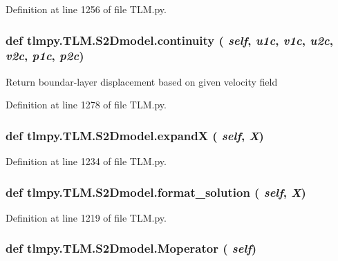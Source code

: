 Definition at line 1256 of file TLM.py.\hypertarget{classtlmpy_1_1TLM_1_1S2Dmodel_ab07406ffa8f2de222fad195cc51a3a2b}{
\subsubsection[{continuity}]{\setlength{\rightskip}{0pt plus 5cm}def tlmpy.TLM.S2Dmodel.continuity ( {\em self}, \/   {\em u1c}, \/   {\em v1c}, \/   {\em u2c}, \/   {\em v2c}, \/   {\em p1c}, \/   {\em p2c})}}
\label{classtlmpy_1_1TLM_1_1S2Dmodel_ab07406ffa8f2de222fad195cc51a3a2b}
\begin{DoxyVerb}Return boundar-layer displacement based on given velocity field\end{DoxyVerb}
 

Definition at line 1278 of file TLM.py.\hypertarget{classtlmpy_1_1TLM_1_1S2Dmodel_a86697bc16c2f9f75825a4c1a5ad0f4a9}{
\subsubsection[{expandX}]{\setlength{\rightskip}{0pt plus 5cm}def tlmpy.TLM.S2Dmodel.expandX ( {\em self}, \/   {\em X})}}
\label{classtlmpy_1_1TLM_1_1S2Dmodel_a86697bc16c2f9f75825a4c1a5ad0f4a9}


Definition at line 1234 of file TLM.py.\hypertarget{classtlmpy_1_1TLM_1_1S2Dmodel_a40f454d109a9388f5f54d2b0bb2dd7bf}{
\subsubsection[{format\_\-solution}]{\setlength{\rightskip}{0pt plus 5cm}def tlmpy.TLM.S2Dmodel.format\_\-solution ( {\em self}, \/   {\em X})}}
\label{classtlmpy_1_1TLM_1_1S2Dmodel_a40f454d109a9388f5f54d2b0bb2dd7bf}


Definition at line 1219 of file TLM.py.\hypertarget{classtlmpy_1_1TLM_1_1S2Dmodel_a6e94bb280c78d6bbcd1031a0b483dc1a}{
\subsubsection[{Moperator}]{\setlength{\rightskip}{0pt plus 5cm}def tlmpy.TLM.S2Dmodel.Moperator ( {\em self})}}
\label{classtlmpy_1_1TLM_1_1S2Dmodel_a6e94bb280c78d6bbcd1031a0b483dc1a}


